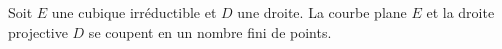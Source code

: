 \begin{demonstration}
\begin{itemize}












    \end{itemize}
\end{demonstration}

\begin{corollaire}
    Soit $E$ une cubique irréductible et $D$ une droite. La courbe plane $E$ et la droite
    projective $D$ se coupent en un nombre fini de points.
\end{corollaire}

